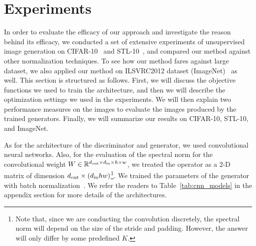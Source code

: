 \documentclass{article}
\newcommand{\bbR}{\mathbb{R}}
\begin{document}
\section{Experiments}
In order to evaluate the efficacy of our approach and investigate the reason behind its efficacy, we conducted a set of extensive experiments of unsupervised image generation on CIFAR-10~\cite[]{torralba200880} and STL-10~\cite[]{coates2011analysis}, and compared our method against other normalization techniques.
To see how our method fares against large dataset, we also applied our method on ILSVRC2012 dataset (ImageNet)~\cite[]{ILSVRC15} as well.
This section is structured as follows.
First, we will discuss the objective functions we used to train the architecture, and then we will describe the optimization settings we used in the experiments.
We will then explain two performance measures on the images to evaluate the images produced by the trained generators.
Finally, we will summarize our results on CIFAR-10, STL-10, and ImageNet.

As for the architecture of the discriminator and generator, we used convolutional neural networks.
Also, for the evaluation of the spectral norm for the convolutional weight $W \in \bbR^{d_{\rm out}\times d_{\rm in} \times h \times w}$, we treated the operator as a 2-D matrix of dimension $d_{\rm out}\times (d_{\rm in} h w)$\footnote{Note that, since we are conducting the convolution discretely, the spectral norm will depend on the size of the stride and padding. 
However, the answer will only differ by some predefined $K$.}.
We trained the parameters of the generator with batch normalization~\cite[]{ioffe2015batch}.
We refer the readers to Table~\ref{tab:cnn_models} in the appendix section for more details of the architectures.
\end{document}
